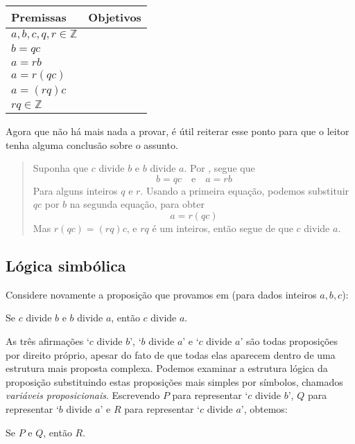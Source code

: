 \begin{example}
\begin{center}
\begin{tabular}{C{150pt}|C{150pt}}
\textbf{Premissas} & \textbf{Objetivos} \\ \hline
$a,b,c,q,r \in \mathbb{Z}$ &  \\
$b=qc$ & \\
$a=rb$ & \\
$a=r(qc)$ & \\
$a=(rq)c$ & \\
$rq \in \mathbb{Z}$ & 
\end{tabular}
\end{center}

Agora que não há mais nada a provar, é útil reiterar esse ponto para que o leitor tenha alguma conclusão sobre o assunto.

\begin{quote}
{\color{gray} Suponha que $c$ divide $b$ e $b$ divide $a$. Por , segue que
\[
b=qc \quad \text{e} \quad a=rb
\]
Para alguns inteiros $q$ e $r$. Usando a primeira equação, podemos substituir $qc$ por $b$ na segunda equação, para obter
\[
a=r(qc)
\]
Mas $r(qc) = (rq)c$, e $rq$ é um inteiros,} então segue de  que $c$ divide $a$.
\end{quote}
\end{example}

\subsection*{Lógica simbólica}

Considere novamente a proposição que provamos em (para dados inteiros $a,b,c$):

\begin{center}
Se $c$ divide $b$ e $b$ divide $a$, então $c$ divide $a$.
\end{center}

As três afirmações `$c$ divide $b$', `$b$ divide $a$' e `$c$ divide $a$' são todas proposições por direito próprio, apesar do fato de que todas elas aparecem dentro de uma estrutura mais proposta complexa. Podemos examinar a estrutura lógica da proposição substituindo estas proposições mais simples por símbolos, chamados \textit{variáveis ​​proposicionais}. Escrevendo $P$ para representar `$c$ divide $b$', $Q$ para representar `$b$ divide $a$' e $R$ para representar `$c$ divide $a$', obtemos:

\begin{center}
Se $P$ e $Q$, então $R$.
\end{center}

